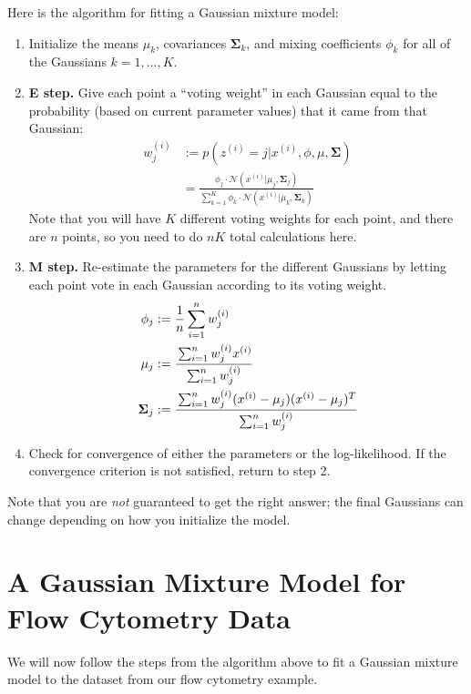 \noindent Here is the algorithm for fitting a Gaussian mixture model:
\begin{enumerate}
\item Initialize the means $\mu_k$, covariances $\boldsymbol\Sigma_k$, and mixing coefficients $\phi_k$ for all of the Gaussians $k=1,\dots,K$.

\item \textbf{E step.} Give each point a ``voting weight'' in each Gaussian equal to the probability (based on current parameter values) that it came from that Gaussian:
\begin{align*} w_j^{(i)} &:= p(z^{(i)} = j | x^{(i)}, \phi, \mu, \boldsymbol\Sigma) \\
&= \frac{\phi_j \cdot \mathcal{N}(x^{(i)}|\mu_j, \boldsymbol\Sigma_j)}{\sum_{k=1}^K \phi_k \cdot \mathcal{N}(x^{(i)}|\mu_k, \boldsymbol\Sigma_k)} \end{align*}
Note that you will have $K$ different voting weights for each point, and there are $n$ points, so you need to do $nK$ total calculations here.

\item \textbf{M step.} Re-estimate the parameters for the different Gaussians by letting each point vote in each Gaussian according to its voting weight.
\begin{align*}
\phi_j &:= \frac{1}{n} \sum_{i=1}^n w_j^{(i)} \\
\mu_j &:= \cfrac{\sum_{i=1}^n w_j^{(i)} x^{(i)}}{\sum_{i=1}^n w_j^{(i)}} \\
\boldsymbol\Sigma_j &:= \cfrac{\sum_{i=1}^n w_j^{(i)} (x^{(i)} - \mu_j)(x^{(i)} - \mu_j)^T}{\sum_{i=1}^n w_j^{(i)}}
\end{align*}
\item Check for convergence of either the parameters or the log-likelihood. If the convergence criterion is not satisfied, return to step 2.
\end{enumerate}

Note that you are \emph{not} guaranteed to get the right answer; the final Gaussians can change depending on how you initialize the model. 


\section{A Gaussian Mixture Model for Flow Cytometry Data}

We will now follow the steps from the algorithm above to fit a Gaussian mixture model to the dataset from our flow cytometry example.

